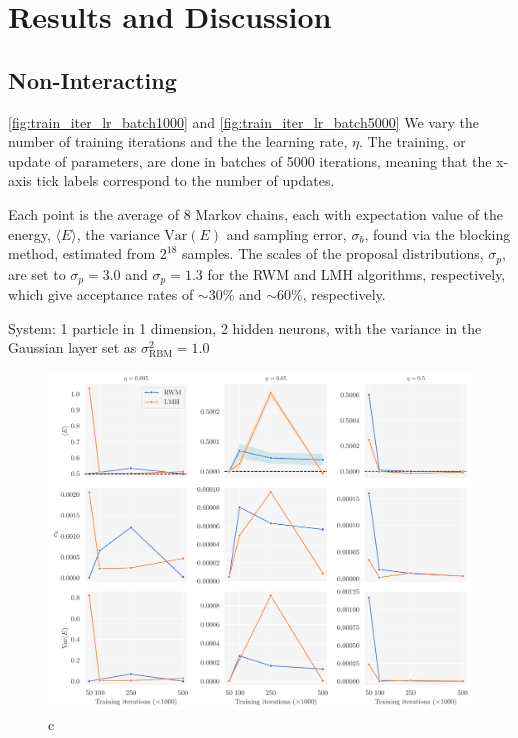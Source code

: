 \section{Results and Discussion}\label{sec:Results}

\subsection{Non-Interacting}\label{sec:project results}

\autoref{fig:train_iter_lr_batch1000} and \autoref{fig:train_iter_lr_batch5000} We vary the number of training iterations and the the learning rate, $\eta$. The training, or update of parameters, are done in batches of 5000 iterations, meaning that the x-axis tick labels correspond to the number of updates. 

Each point is the average of 8 Markov chains, each with expectation value of the energy, $\langle E \rangle$, the variance $\mathrm{Var}(E)$ and sampling error, $\sigma_b$, found via the blocking method, estimated from $2^{18}$ samples. The scales of the proposal distributions, $\sigma_p$, are set to $\sigma_p=3.0$ and $\sigma_p=1.3$ for the RWM and LMH algorithms, respectively, which give acceptance rates of $\sim 30\%$ and $\sim60\%$, respectively. 

System: 1 particle in 1 dimension, 2 hidden neurons, with the variance in the Gaussian layer set as $\sigma_\mathrm{RBM}^2=1.0$

\begin{figure}[!htb]
\begin{center}\includegraphics[width=\textwidth]{latex/figures/training_cycles_lr_batch1000.pdf}
\end{center}
\caption{c}
\label{fig:train_iter_lr_batch1000}
\end{figure}

